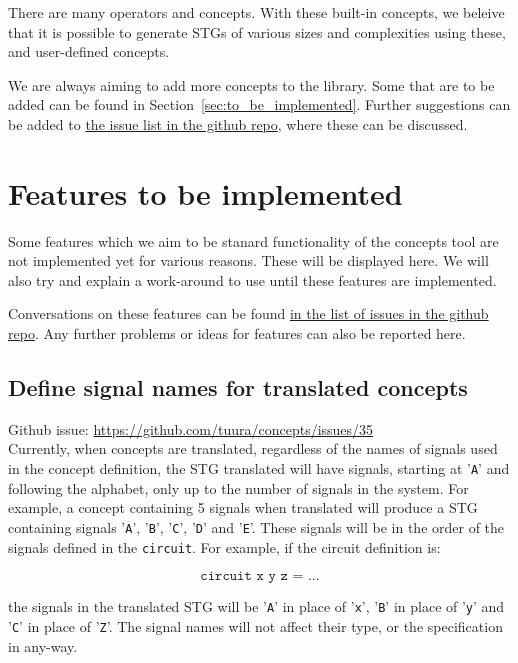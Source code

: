 \documentclass{proc}
\begin{document}
There are many operators and concepts. With these built-in concepts, we beleive that it is possible to generate STGs of various sizes and complexities using these, and user-defined 
concepts. 

We are always aiming to add more concepts to the library. Some that are to be added can be found in Section~\ref{sec:to_be_implemented}. 
Further suggestions can be added to \href{https://github.com/tuura/concepts/issues}{the issue list in the github repo}, where these can be discussed.

\section{Features to be implemented \label{sec:to_be_implemented}}

Some features which we aim to be stanard functionality of the concepts tool are not implemented yet for various reasons. 
These will be displayed here. We will also try and explain a work-around to use until these features are implemented.

Conversations on these features can be found \href{https://github.com/tuura/concepts/issues}{in the list of issues in the github repo}. 
Any further problems or ideas for features can also be reported here.

\subsection*{Define signal names for translated concepts}

Github issue: \url{https://github.com/tuura/concepts/issues/35}\\

Currently, when concepts are translated, regardless of the names of signals used in the concept definition, the STG translated will have signals, starting at '\texttt{A}' and following the 
alphabet, only up to the number of signals in the system. For example, a concept containing 5 signals when translated will produce a STG containing signals '\texttt{A}', '\texttt{B}', 
'\texttt{C}', '\texttt{D}' and '\texttt{E}'. These signals will be in the order of the signals defined in the \texttt{circuit}. For example, if the circuit definition is:

  \[
  \texttt{circuit x y z = ...}
  \]

the signals in the translated STG will be '\texttt{A}' in place of '\texttt{x}', '\texttt{B}' in place of '\texttt{y}' and '\texttt{C}' in place of '\texttt{Z}'.  
The signal names will not affect their type, or the specification in any-way. \\
\end{document}

